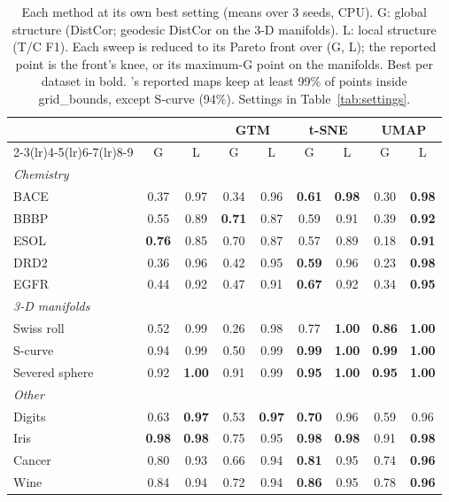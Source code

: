 \begin{table}[t]
\centering
\footnotesize
\setlength{\tabcolsep}{3.5pt}
\caption{Each method at its own best setting (means over 3 seeds, CPU). G: global structure (DistCor; geodesic DistCor on the 3-D manifolds). L: local structure (T/C F1). Each sweep is reduced to its Pareto front over (G, L); the reported point is the front's knee, or its maximum-G point on the manifolds. Best per dataset in bold. \nfmap{}'s reported maps keep at least 99\% of points inside grid\_bounds, except S-curve (94\%). Settings in Table~\ref{tab:settings}.}
\label{tab:comparison}
\begin{tabular}{lcccccccc}
\toprule
 & \multicolumn{2}{c}{\nfmap{}} & \multicolumn{2}{c}{GTM} & \multicolumn{2}{c}{t-SNE} & \multicolumn{2}{c}{UMAP} \\
\cmidrule(lr){2-3}\cmidrule(lr){4-5}\cmidrule(lr){6-7}\cmidrule(lr){8-9}
 & G & L & G & L & G & L & G & L \\
\midrule
\multicolumn{9}{l}{\textit{Chemistry}} \\
\quad BACE & 0.37 & 0.97 & 0.34 & 0.96 & \textbf{0.61} & \textbf{0.98} & 0.30 & \textbf{0.98} \\
\quad BBBP & 0.55 & 0.89 & \textbf{0.71} & 0.87 & 0.59 & 0.91 & 0.39 & \textbf{0.92} \\
\quad ESOL & \textbf{0.76} & 0.85 & 0.70 & 0.87 & 0.57 & 0.89 & 0.18 & \textbf{0.91} \\
\quad DRD2 & 0.36 & 0.96 & 0.42 & 0.95 & \textbf{0.59} & 0.96 & 0.23 & \textbf{0.98} \\
\quad EGFR & 0.44 & 0.92 & 0.47 & 0.91 & \textbf{0.67} & 0.92 & 0.34 & \textbf{0.95} \\
\multicolumn{9}{l}{\textit{3-D manifolds}} \\
\quad Swiss roll & 0.52 & 0.99 & 0.26 & 0.98 & 0.77 & \textbf{1.00} & \textbf{0.86} & \textbf{1.00} \\
\quad S-curve & 0.94 & 0.99 & 0.50 & 0.99 & \textbf{0.99} & \textbf{1.00} & \textbf{0.99} & \textbf{1.00} \\
\quad Severed sphere & 0.92 & \textbf{1.00} & 0.91 & 0.99 & \textbf{0.95} & \textbf{1.00} & \textbf{0.95} & \textbf{1.00} \\
\multicolumn{9}{l}{\textit{Other}} \\
\quad Digits & 0.63 & \textbf{0.97} & 0.53 & \textbf{0.97} & \textbf{0.70} & 0.96 & 0.59 & 0.96 \\
\quad Iris & \textbf{0.98} & \textbf{0.98} & 0.75 & 0.95 & \textbf{0.98} & \textbf{0.98} & 0.91 & \textbf{0.98} \\
\quad Cancer & 0.80 & 0.93 & 0.66 & 0.94 & \textbf{0.81} & 0.95 & 0.74 & \textbf{0.96} \\
\quad Wine & 0.84 & 0.94 & 0.72 & 0.94 & \textbf{0.86} & 0.95 & 0.78 & \textbf{0.96} \\
\bottomrule
\end{tabular}
\end{table}
